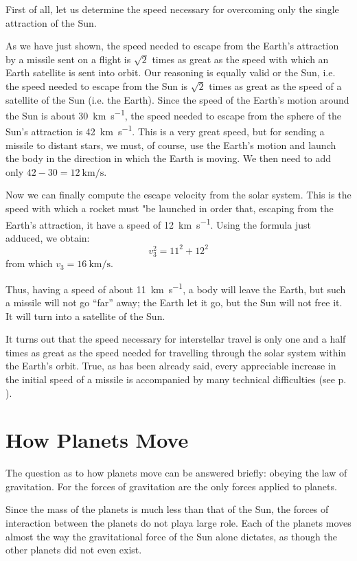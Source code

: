 First of all, let us determine the speed necessary for
overcoming only the single attraction of the Sun.

As we have just shown, the speed needed to escape
from the Earth's attraction by a missile sent on a flight
is $\sqrt{2}$ times as great as the speed with which an Earth
satellite is sent into orbit. Our reasoning is equally valid
or the Sun, i.e. the speed needed to escape from the Sun
is $\sqrt{2}$ times as great as the speed of a satellite of the Sun
(i.e. the Earth). Since the speed of the Earth's motion
around the Sun is about \SI{30}{\kilo\meter\per\second}, the speed needed to
escape from the sphere of the Sun's attraction is \SI{42}{\kilo\meter\per\second}.
This is a very great speed, but for sending a missile to
distant stars, we must, of course, use the Earth's motion
and launch the body in the direction in which the Earth
is moving. We then need to add only $42 - 30 = \SI{12}{\kilo\meter\per\second}$.

Now we can finally compute the escape velocity from
the solar system. This is the speed with which a rocket
must "be launched in order that, escaping from the
Earth's attraction, it have a speed of \SI{12}{\kilo\meter\per\second}. Using
the formula just adduced, we obtain:
 \begin{equation*}%
v_{3}^{2} = 11^{2} + 12^{2}
 \end{equation*}
from which $v_{3} = \SI{16}{\kilo\meter\per\second}$.

Thus, having a speed of about \SI{11}{\kilo\meter\per\second}, a body will
leave the Earth, but such a missile will not go ``far'' away;
the Earth let it go, but the Sun will not free it. It will
turn into a satellite of the Sun.

It turns out that the speed necessary for interstellar
travel is only one and a half times as great as the speed
needed for travelling through the solar system within the
Earth's orbit. True, as has been already said, every
appreciable increase in the initial speed of a missile is
accompanied by many technical difficulties (see p. \pageref{rocket-eq}).


\section{How Planets Move}
The question as to how planets move can be answered
briefly: obeying the law of gravitation. For the forces
of gravitation are the only forces applied to planets.

Since the mass of the planets is much less than that
of the Sun, the forces of interaction between the planets
do not playa large role. Each of the planets moves almost
the way the gravitational force of the Sun alone dictates,
as though the other planets did not even exist.

